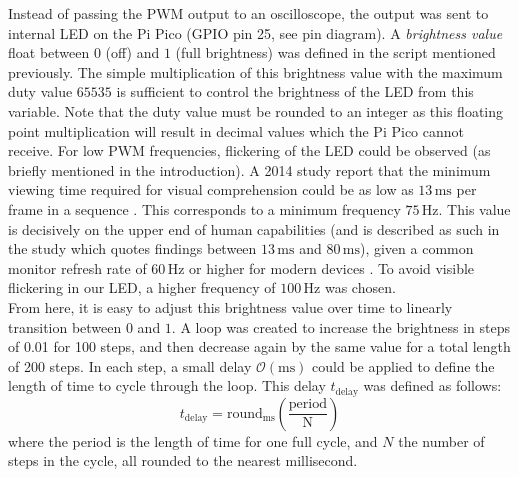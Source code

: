 \documentclass[%
 reprint,
 amsmath,amssymb,
 aps,
]{revtex4-2}
\begin{document}
    Instead of passing the PWM output to an oscilloscope, the output was sent to internal LED on the Pi Pico (GPIO pin 25, see pin diagram). A \textit{brightness value} float between $0$ (off) and $1$ (full brightness) was defined in the script mentioned previously. The simple multiplication of this brightness value with the maximum duty value $65535$ is sufficient to control the brightness of the LED from this variable. Note that the duty value must be rounded to an integer as this floating point multiplication will result in decimal values which the Pi Pico cannot receive. For low PWM frequencies, flickering of the LED could be observed (as briefly mentioned in the introduction). A 2014 study report that the minimum viewing time required for visual comprehension could be as low as $13\,\text{ms}$ per frame in a sequence \cite{potter_2014}. This corresponds to a minimum frequency $75 \,\text{Hz}$. This value is decisively on the upper end of human capabilities (and is described as such in the study which quotes findings between $13\,\text{ms}$ and $80\,\text{ms}$), given a common monitor refresh rate of $60\,\text{Hz}$ or higher for modern devices \cite{refresh}. To avoid visible flickering in our LED, a higher frequency of $100 \,\text{Hz}$ was chosen.\\

    From here, it is easy to adjust this brightness value over time to linearly transition between $0$ and $1$. A loop was created to increase the brightness in steps of 0.01 for 100 steps, and then decrease again by the same value for a total length of 200 steps. In each step, a small delay $\mathcal{O}(\text{ms})$ could be applied to define the length of time to cycle through the loop. This delay $t_\text{delay}$ was defined as follows:
    \begin{equation}
        t_\text{delay} = \text{round}_\text{ms}\left( \frac{\text{period}}{\text{N}} \right)
    \end{equation}where the period is the length of time for one full cycle, and $N$ the number of steps in the cycle, all rounded to the nearest millisecond.\\
\end{document}
